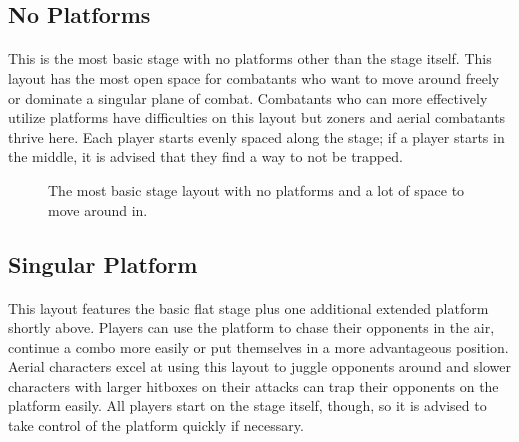 \subsection{No Platforms}

\paragraph{} This is the most basic stage with no platforms other than the stage itself. This layout has the most open space for combatants who want to move around freely or dominate a singular plane of combat. Combatants who can more effectively utilize platforms have difficulties on this layout but zoners and aerial combatants thrive here. Each player starts evenly spaced along the stage; if a player starts in the middle, it is advised that they find a way to not be trapped.

\begin{figure}[h!]
    \centering
    \caption{The most basic stage layout with no platforms and a lot of space to move around in.}
\end{figure}

\pagebreak

\subsection{Singular Platform}

\paragraph{} This layout features the basic flat stage plus one additional extended platform shortly above. Players can use the platform to chase their opponents in the air, continue a combo more easily or put themselves in a more advantageous position. Aerial characters excel at using this layout to juggle opponents around and slower characters with larger hitboxes on their attacks can trap their opponents on the platform easily. All players start on the stage itself, though, so it is advised to take control of the platform quickly if necessary.

